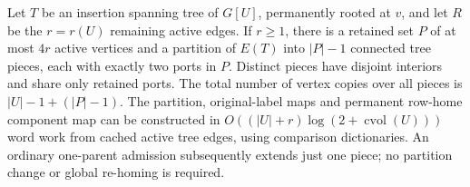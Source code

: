 \begin{lemma}
\label{lem:op3-marked-tree-partition}
Let $T$ be an insertion spanning tree of $G[U]$, permanently rooted at $v$,
and let $R$ be the $r=r(U)$ remaining active edges. If $r\geq1$, there is
a retained set $P$ of at most $4r$ active vertices and a partition of
$E(T)$ into $|P|-1$ connected tree pieces, each with exactly two ports in
$P$. Distinct pieces have disjoint interiors and share only retained ports.
The total number of vertex copies over all pieces is
$|U|-1+(|P|-1)$.
The partition, original-label maps and permanent row-home component map
can be constructed in $O((|U|+r)\log(2+\operatorname{cvol}(U)))$ word
work from cached active tree edges, using comparison dictionaries.
An ordinary one-parent admission subsequently extends just one piece;
no partition change or global re-homing is required.
\end{lemma}
